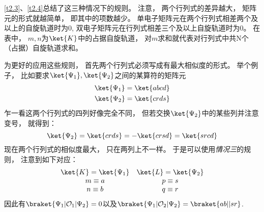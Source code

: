 \autoref{t2.3}、\autoref{t2.4}总结了这三种情况下的规则。
注意，
两个行列式的差异越大，
矩阵元的形式就越简单，
即其中的项数越少。
单电子矩阵元在两个行列式相差两个及以上的自旋轨道时为0, 
双电子矩阵元在行列式相差三个及以上自旋轨道时为0。
在表中，
$m,n$为$\ket{K}$中的占据自旋轨道，
对$m$求和就代表对行列式中共N个（占据）自旋轨道求和。


为更好的应用这些规则，
首先两个行列式必须写成有最大相似度的形式。
举个例子，
比如要求$\ket{\Psi_1},\ket{\Psi_2}$之间的某算符的矩阵元
\begin{align}
\ket{\Psi_1}=\ket{abcd}\notag\\
\ket{\Psi_2}=\ket{crds}\notag
\end{align}
乍一看这两个行列式的四列好像完全不同，
但若交换$\ket{\Psi_2}$中的某些列并注意变号，
就得到：
\begin{equation*}
\ket{\Psi_2}=\ket{crds}=-\ket{crsd}=\ket{srcd}
\end{equation*}
现在两个行列式的相似度最大，
只在两列上不一样。
于是可以使用{\textit{情况三}}的规则，
注意到如下对应：
\[\begin{array}{cc}
\ket{K}=\ket{\Psi_1}&\ket{L}=\ket{\Psi_2}\\
m\equiv a & p\equiv s\\
n\equiv b &q\equiv r
\end{array}\]
因此有$\braket{\Psi_1|\mathcal{O}_1|\Psi_2}=0$以及$\braket{\Psi_1|\mathcal{O}_2|\Psi_2}=\braket{ab||sr}$.


